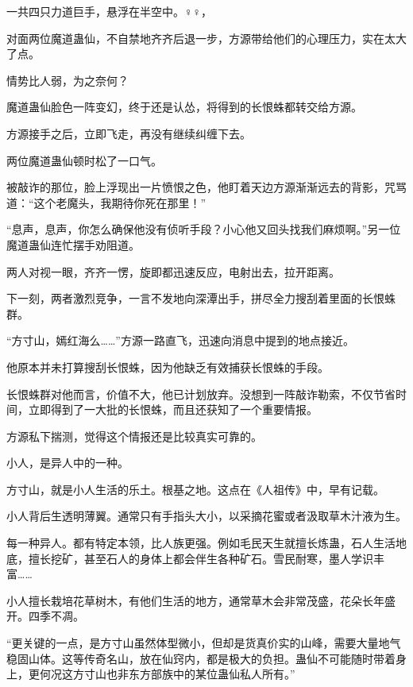 
\begin{this_body}

一共四只力道巨手，悬浮在半空中。♀♀，

对面两位魔道蛊仙，不自禁地齐齐后退一步，方源带给他们的心理压力，实在太大了点。

情势比人弱，为之奈何？

魔道蛊仙脸色一阵变幻，终于还是认怂，将得到的长恨蛛都转交给方源。

方源接手之后，立即飞走，再没有继续纠缠下去。

两位魔道蛊仙顿时松了一口气。

被敲诈的那位，脸上浮现出一片愤恨之色，他盯着天边方源渐渐远去的背影，咒骂道：“这个老魔头，我期待你死在那里！”

“息声，息声，你怎么确保他没有侦听手段？小心他又回头找我们麻烦啊。”另一位魔道蛊仙连忙摆手劝阻道。

两人对视一眼，齐齐一愣，旋即都迅速反应，电射出去，拉开距离。

下一刻，两者激烈竞争，一言不发地向深潭出手，拼尽全力搜刮着里面的长恨蛛群。

“方寸山，嫣红海么……”方源一路直飞，迅速向消息中提到的地点接近。

他原本并未打算搜刮长恨蛛，因为他缺乏有效捕获长恨蛛的手段。

长恨蛛群对他而言，价值不大，他已计划放弃。没想到一阵敲诈勒索，不仅节省时间，立即得到了一大批的长恨蛛，而且还获知了一个重要情报。

方源私下揣测，觉得这个情报还是比较真实可靠的。

小人，是异人中的一种。

方寸山，就是小人生活的乐土。根基之地。这点在《人祖传》中，早有记载。

小人背后生透明薄翼。通常只有手指头大小，以采摘花蜜或者汲取草木汁液为生。

每一种异人。都有特定本领，比人族更强。例如毛民天生就擅长炼蛊，石人生活地底，擅长挖矿，甚至石人的身体上都会伴生各种矿石。雪民耐寒，墨人学识丰富……

小人擅长栽培花草树木，有他们生活的地方，通常草木会非常茂盛，花朵长年盛开。四季不凋。

“更关键的一点，是方寸山虽然体型微小，但却是货真价实的山峰，需要大量地气稳固山体。这等传奇名山，放在仙窍内，都是极大的负担。蛊仙不可能随时带着身上，更何况这方寸山也非东方部族中的某位蛊仙私人所有。”


\end{this_body}
